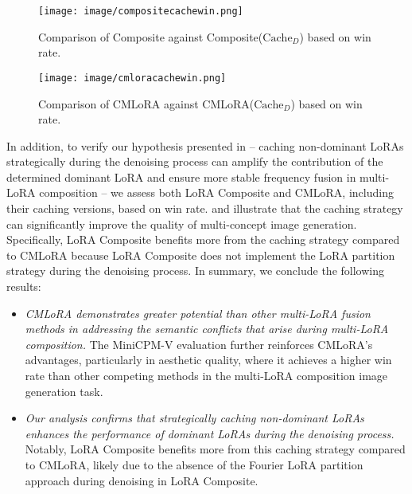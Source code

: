 \begin{figure}[H]
    \centering
    \setlength{\abovecaptionskip}{-1pt}
    \setlength{\belowcaptionskip}{-10pt}
    \begin{minipage}{0.49\textwidth}
        \centering
        \texttt{[image: image/compositecachewin.png]}
        \caption{Comparison of Composite against Composite($\text{Cache}_{D}$) based on win rate.}
        \label{fig:compositecachewin}
    \end{minipage}
    \hfill
    \begin{minipage}{0.49\textwidth}
        \centering
        \texttt{[image: image/cmloracachewin.png]}
        \caption{Comparison of CMLoRA against CMLoRA($\text{Cache}_{D}$) based on win rate.}
        \label{fig:cmloracachewin}
    \end{minipage}
\end{figure}
\vspace{-7pt}
In addition, to verify our hypothesis presented in  -- caching non-dominant LoRAs strategically during the denoising process can amplify the contribution of the determined dominant LoRA and ensure more stable frequency fusion in multi-LoRA composition -- we assess both LoRA Composite and CMLoRA, including their caching versions, based on win rate.  and  illustrate that the caching strategy can significantly improve the quality of multi-concept image generation. Specifically, LoRA Composite benefits more from the caching strategy compared to CMLoRA because LoRA Composite does not implement the LoRA partition strategy during the denoising process. In summary, we conclude the following results: 
\begin{itemize}[noitemsep, topsep=-5pt, leftmargin=*]
    \item \textit{CMLoRA demonstrates greater potential than other multi-LoRA fusion methods in addressing the semantic conflicts that arise during multi-LoRA composition.} The MiniCPM-V evaluation further reinforces CMLoRA's advantages, particularly in aesthetic quality, where it achieves a higher win rate than other competing methods in the multi-LoRA composition image generation task.
    \item \textit{Our analysis confirms that strategically caching non-dominant LoRAs enhances the performance of dominant LoRAs during the denoising process.} Notably, LoRA Composite benefits more from this caching strategy compared to CMLoRA, likely due to the absence of the Fourier LoRA partition approach during denoising in LoRA Composite.
\end{itemize}